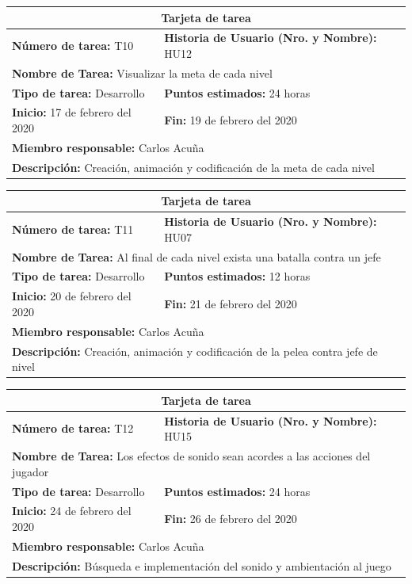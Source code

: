 \documentclass[a4paper, openright, 12pt]{report}
\begin{document}
\begin{longtable}{| p{6cm} | p{6cm} |}
\hline
\multicolumn{2}{|c|}{\textbf{Tarjeta de tarea}} \\
\hline
\textbf{Número de tarea:} T10 & \textbf{Historia de Usuario (Nro. y Nombre):} HU12\\
\hline
\multicolumn{2}{|p{12cm}|}{\textbf{Nombre de Tarea:} Visualizar la meta de cada
nivel} \\ \hline
\textbf{Tipo de tarea:} Desarrollo & \textbf{Puntos estimados:} 24 horas  \\ \hline
\textbf{Inicio:} 17 de febrero del 2020 & \textbf{Fin:} 19 de febrero del 2020 \\ \hline
\multicolumn{2}{|p{12cm}|}{\textbf{Miembro responsable:} Carlos Acuña} \\ \hline
\multicolumn{2}{|p{12cm}|}{\textbf{Descripción:} Creación, animación y codificación de la meta de cada nivel} \\ \hline
\end{longtable}

\begin{longtable}{| p{6cm} | p{6cm} |}
\hline
\multicolumn{2}{|c|}{\textbf{Tarjeta de tarea}} \\
\hline
\textbf{Número de tarea:} T11 & \textbf{Historia de Usuario (Nro. y Nombre):} HU07\\
\hline
\multicolumn{2}{|p{12cm}|}{\textbf{Nombre de Tarea:} Al final de cada nivel exista una batalla contra un jefe} \\ \hline
\textbf{Tipo de tarea:} Desarrollo & \textbf{Puntos estimados:} 12 horas  \\ \hline
\textbf{Inicio:} 20 de febrero del 2020 & \textbf{Fin:} 21 de febrero del 2020 \\ \hline
\multicolumn{2}{|p{12cm}|}{\textbf{Miembro responsable:} Carlos Acuña} \\ \hline
\multicolumn{2}{|p{12cm}|}{\textbf{Descripción:} Creación, animación y codificación de la pelea contra jefe de nivel} \\ \hline
\end{longtable}
\clearpage
\begin{longtable}{| p{6cm} | p{6cm} |}
\hline
\multicolumn{2}{|c|}{\textbf{Tarjeta de tarea}} \\
\hline
\textbf{Número de tarea:} T12 & \textbf{Historia de Usuario (Nro. y Nombre):} HU15\\
\hline
\multicolumn{2}{|p{12cm}|}{\textbf{Nombre de Tarea:} Los efectos de sonido sean
acordes a las acciones del jugador} \\ \hline
\textbf{Tipo de tarea:} Desarrollo & \textbf{Puntos estimados:} 24 horas  \\ \hline
\textbf{Inicio:} 24 de febrero del 2020 & \textbf{Fin:} 26 de febrero del 2020 \\ \hline
\multicolumn{2}{|p{12cm}|}{\textbf{Miembro responsable:} Carlos Acuña} \\ \hline
\multicolumn{2}{|p{12cm}|}{\textbf{Descripción:} Búsqueda e implementación del sonido y ambientación al juego} \\ \hline
\end{longtable}
\end{document}
